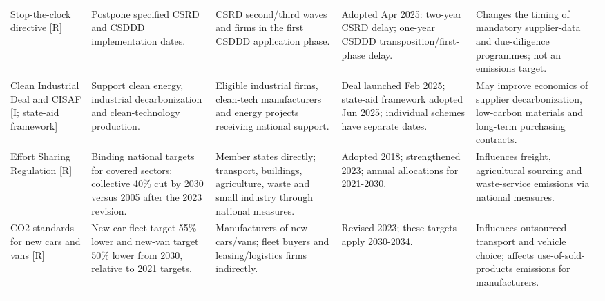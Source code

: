 \documentclass[10pt,a4paper,landscape]{article}
\begin{document}
\begin{tabularx}{\textwidth}{Y{0.85}Y{1.00}Y{0.85}Y{1.05}Y{1.25}}
\addlinespace[5pt]
Stop-the-clock directive [R]\cite{stopclock} & Postpone specified CSRD and CSDDD implementation dates. & CSRD second/third waves and firms in the first CSDDD application phase. & Adopted Apr 2025: two-year CSRD delay; one-year CSDDD transposition/first-phase delay. & Changes the timing of mandatory supplier-data and due-diligence programmes; not an emissions target. \\
\addlinespace[5pt]
Clean Industrial Deal and CISAF [I; state-aid framework]\cite{cleandeal} & Support clean energy, industrial decarbonization and clean-technology production. & Eligible industrial firms, clean-tech manufacturers and energy projects receiving national support. & Deal launched Feb 2025; state-aid framework adopted Jun 2025; individual schemes have separate dates. & May improve economics of supplier decarbonization, low-carbon materials and long-term purchasing contracts. \\
\addlinespace[5pt]
Effort Sharing Regulation [R]\cite{esr} & Binding national targets for covered sectors: collective 40\% cut by 2030 versus 2005 after the 2023 revision. & Member states directly; transport, buildings, agriculture, waste and small industry through national measures. & Adopted 2018; strengthened 2023; annual allocations for 2021-2030. & Influences freight, agricultural sourcing and waste-service emissions via national measures. \\
\addlinespace[5pt]
CO2 standards for new cars and vans [R]\cite{cars} & New-car fleet target 55\% lower and new-van target 50\% lower from 2030, relative to 2021 targets. & Manufacturers of new cars/vans; fleet buyers and leasing/logistics firms indirectly. & Revised 2023; these targets apply 2030-2034. & Influences outsourced transport and vehicle choice; affects use-of-sold-products emissions for manufacturers. \\
\addlinespace[5pt]
\end{tabularx}
\normalsize

\clearpage
\end{document}
